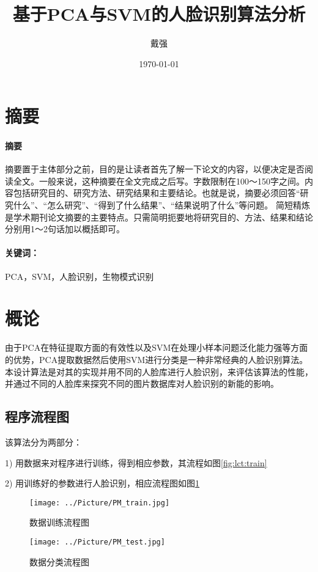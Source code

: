 \documentclass[a4paper,12pt]{ctexart}
\title{基于PCA与SVM的人脸识别算法分析}
\author{戴强}
\date{\today}
\renewenvironment*{abstract}[1]{%
\newcommand\gjc{#1}
\paragraph{摘要}
}{\paragraph{关键词：}\gjc }
\begin{document}
\maketitle

\section{摘要}
\label{sec:zhaiyao}

\begin{abstract}{PCA，SVM，人脸识别，生物模式识别}
摘要置于主体部分之前，目的是让读者首先了解一下论文的内容，以便决定是否阅读全文。一般来说，这种摘要在全文完成之后写。字数限制在100～150字之间。内容包括研究目的、研究方法、研究结果和主要结论。也就是说，摘要必须回答“研究什么”、“怎么研究”、“得到了什么结果”、“结果说明了什么”等问题。
简短精炼是学术期刊论文摘要的主要特点。只需简明扼要地将研究目的、方法、结果和结论分别用1～2句话加以概括即可。
\end{abstract}


\newpage


\tableofcontents

\newpage


\section{概论}
由于PCA在特征提取方面的有效性以及SVM在处理小样本问题泛化能力强等方面的优势，PCA提取数据然后使用SVM进行分类是一种非常经典的人脸识别算法。本设计算法是对其的实现并用不同的人脸库进行人脸识别，来评估该算法的性能，并通过不同的人脸库来探究不同的图片数据库对人脸识别的新能的影响。

\subsection{程序流程图}
该算法分为两部分：

1) 用数据来对程序进行训练，得到相应参数，其流程如图\ref{fig:lct:train}

2) 用训练好的参数进行人脸识别，相应流程图如图\ref{fig:lct:test}
\begin{figure}[htb]
\begin{minipage}[t]{0.5\linewidth}
\centering
\texttt{[image: ../Picture/PM\_train.jpg]}
\caption{数据训练流程图}
\label{fig:lct:train}
\end{minipage}%
\begin{minipage}[t]{0.5\linewidth}
\centering
\texttt{[image: ../Picture/PM\_test.jpg]}
\caption{数据分类流程图}
\label{fig:lct:test}
\end{minipage}
\end{figure}
\end{document}
